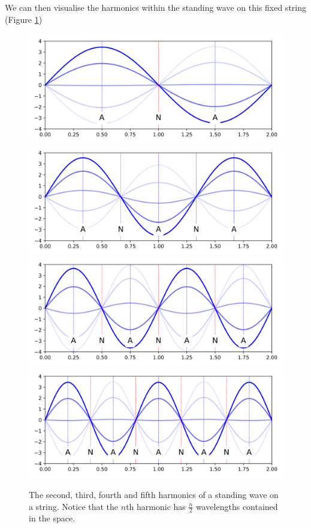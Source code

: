 \documentclass[
]{book}
\begin{document}
We can then visualise the harmonics within the standing wave on this fixed string (Figure \ref{fig:ch10-stringharmonics1})

\begin{figure}

{\centering \includegraphics[width=0.7\linewidth]{visualisations/ch10-standingwave_stages-n2} \includegraphics[width=0.7\linewidth]{visualisations/ch10-standingwave_stages-n3} \includegraphics[width=0.7\linewidth]{visualisations/ch10-standingwave_stages-n4} \includegraphics[width=0.7\linewidth]{visualisations/ch10-standingwave_stages-n5} 

}

\caption{The second, third, fourth and fifth harmonics of a standing wave on a string. Notice that the $n$th harmonic has $\frac{n}{2}$ wavelengths contained in the space.}\label{fig:ch10-stringharmonics1}
\end{figure}
\end{document}
